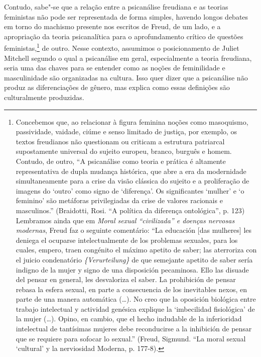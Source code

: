 Contudo, sabe"-se que a relação entre a psicanálise freudiana e as
teorias feministas não pode ser representada de forma simples, havendo
longos debates em torno do machismo presente nos escritos de Freud, de
um lado, e a apropriação da teoria psicanalítica para o aprofundamento
crítico de questões feministas,\footnote{Concebemos que, ao relacionar à
  figura feminina noções como masoquismo, passividade, vaidade, ciúme e
  senso limitado de justiça, por exemplo, os textos freudianos não
  questionam ou criticam a estrutura patriarcal supostamente universal
  do sujeito europeu, branco, burguês e homem. Contudo, de outro, ``A
  psicanálise como teoria e prática é altamente representativa de dupla
  mudança histórica, que abre a era da modernidade simultaneamente para
  a crise da visão clássica do sujeito e a proliferação de imagens do
  `outro' como signo de `diferença'. Os significantes `mulher' e `o
  feminino' são metáforas privilegiadas da crise de valores racionais e
  masculinos.'' (Braidotti, Rosi. ``A política da diferença
  ontológica'', p. 123) Lembramos ainda que em \emph{Moral sexual
  ``civilizada'' e doenças nervosas modernas}, Freud faz o seguinte
  comentário: ``La educación {[}das mulheres{]} les deniega el ocuparse
  intelectualmente de los problemas sexuales, para los cuales, empero,
  traen congénito el máximo apetito de saber; las aterroriza con el
  juicio condenatório \emph{\{Verurteilung\}} de que semejante apetito
  de saber sería indigno de la mujer y signo de una disposición
  pecaminosa. Ello las disuade del pensar en general, les desvaloriza el
  saber. La prohibición de pensar rebasa la esfera sexual, en parte a
  consecuencia de los inevitables nexos, en parte de una manera
  automática (\ldots{}). No creo que la oposición biológica entre trabajo
  intelectual y actividad genésica explique la `imbecilidad fisiológica'
  de la mujer (\ldots{}). Opino, en cambio, que el hecho indudable de la
  inferioridad intelectual de tantísimas mujeres debe reconducirse a la
  inhibición de pensar que se requiere para sofocar lo sexual.'' (Freud,
  Sigmund. ``La moral sexual `cultural' y la nerviosidad Moderna, p.
  177-8).} de outro. Nesse contexto, assumimos o posicionamento de
Juliet Mitchell segundo o qual a psicanálise em geral, especialmente a
teoria freudiana, seria uma das chaves para se entender como as noções
de feminilidade e masculinidade são organizadas na cultura. Isso quer
dizer que a psicanálise não produz as diferenciações de gênero, mas
explica como essas definições são culturalmente produzidas.


